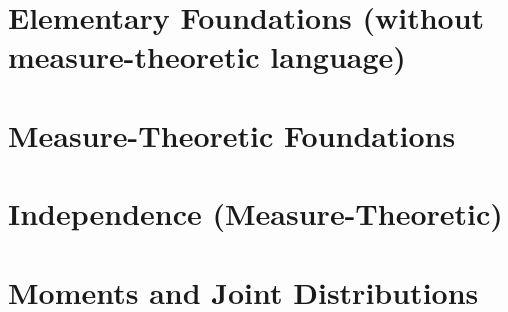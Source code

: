 \section{Elementary Foundations (without measure-theoretic language)}













\section{Measure-Theoretic Foundations}








\section{Independence (Measure-Theoretic)}





\section{Moments and Joint Distributions}

